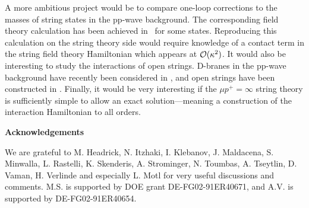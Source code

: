 A more ambitious project would be to compare one-loop corrections
to the masses of string states in the pp-wave background.
The corresponding field theory calculation has been achieved in
\seven\ for some states.
Reproducing this calculation on the string theory side
would require knowledge of a contact term in the
string field theory Hamiltonian which appears at ${\cal{O}}(\kappa^2)$.
It would also be interesting to study the interactions
of open strings.  D-branes 
in the pp-wave background have recently been considered in
, and open strings have
been constructed in
.
Finally, it would be very interesting if the $\mu p^+ = \infty$
string
theory is sufficiently simple to allow an exact solution---meaning
a construction of the interaction Hamiltonian to all orders.

\bigskip
\bigskip
\bigskip


\centerline {\bf Acknowledgements}

\smallskip

We are grateful to M. Headrick, N. Itzhaki, I. Klebanov, J. Maldacena,
S. Minwalla, L. Rastelli, K. Skenderis, A. Strominger,
N. Toumbas, A. Tseytlin, D. Vaman, H. Verlinde
and especially L. Motl for very 
useful discussions and comments. 
M.S. is supported by DOE grant DE-FG02-91ER40671, and
A.V. is supported by DE-FG02-91ER40654.





